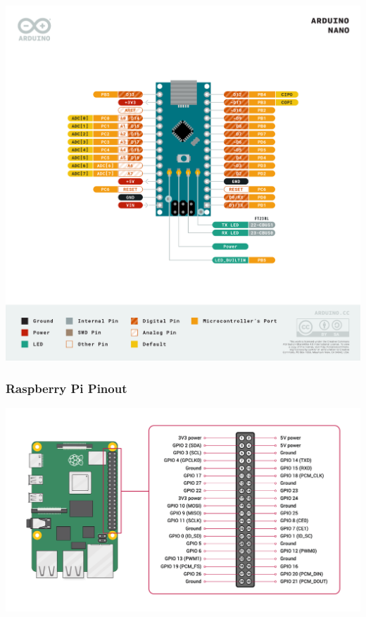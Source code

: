 \documentclass{article}
\begin{document}
	\includegraphics[width=\linewidth]{A000005-pinout}
		
		\subsubsection{Raspberry Pi Pinout}
	
	\includegraphics[width=\linewidth]{GPIO-Pinout-Diagram-2}
	
\end{document}
